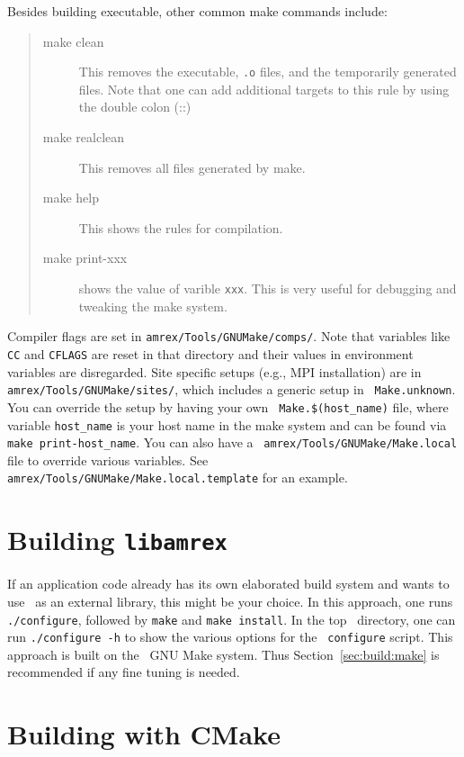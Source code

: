Besides building executable, other common make commands include:
\begin{quote}
\begin{description}
  \item[make clean] This removes the executable, {\tt .o} files, and
    the temporarily generated files.  Note that one can add additional
    targets to this rule by using the double colon (::)
  \item[make realclean] This removes all files generated by make.
  \item[make help] This shows the rules for compilation.
  \item[make print-xxx] shows the value of varible {\tt xxx}.  This is
    very useful for debugging and tweaking the make system.
\end{description}
\end{quote}

Compiler flags are set in {\tt amrex/Tools/GNUMake/comps/}.  Note that
variables like {\tt CC} and {\tt CFLAGS} are reset in that directory
and their values in environment variables are disregarded. Site
specific setups (e.g., MPI installation) are in {\tt
  amrex/Tools/GNUMake/sites/}, which includes a generic setup in {\tt
  Make.unknown}.  You can override the setup by having your own {\tt
  Make.\$(host\_name)} file, where variable {\tt host\_name} is your
host name in the make system and can be found via {\tt make
  print-host\_name}.  You can also have a {\tt
  amrex/Tools/GNUMake/Make.local} file to override various variables.
See {\tt amrex/Tools/GNUMake/Make.local.template} for an example.

\section{Building {\tt libamrex}}
\label{sec:build:lib}

If an application code already has its own elaborated build system and
wants to use \amrex\ as an external library, this might be your
choice.  In this approach, one runs {\tt ./configure}, followed by
{\tt make} and {\tt make install}.  In the top \amrex\ directory, one
can run {\tt ./configure -h} to show the various options for the {\tt
  configure} script.  This approach is built on the \amrex\ GNU Make
system.  Thus Section~\ref{sec:build:make} is recommended if any fine
tuning is needed.

\section{Building with CMake}
\label{sec:build:cmake}


